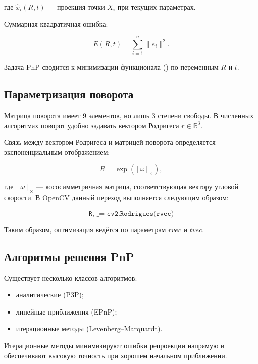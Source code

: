 \documentclass[a4paper,12pt]{article}
\begin{document}
где $\hat{x}_i(R,t)$ --- проекция точки $X_i$ при текущих параметрах.

Суммарная квадратичная ошибка:

\begin{equation}
E(R,t) = \sum_{i=1}^{n} \| e_i \|^2.
\end{equation}

Задача PnP сводится к минимизации функционала (\theequation) по переменным $R$ и $t$.

\subsection*{Параметризация поворота}

Матрица поворота имеет 9 элементов, но лишь 3 степени свободы. В численных алгоритмах поворот удобно задавать вектором Родригеса $r \in \mathbb{R}^3$.

Связь между вектором Родригеса и матрицей поворота определяется экспоненциальным отображением:

\begin{equation}
R = \exp([\omega]_\times),
\end{equation}

где $[\omega]_\times$ --- кососимметричная матрица, соответствующая вектору угловой скорости. В OpenCV данный переход выполняется следующим образом:

\begin{equation*}
\texttt{R, \_ = cv2.Rodrigues(rvec)}
\end{equation*}

Таким образом, оптимизация ведётся по параметрам $rvec$ и $tvec$.

\subsection*{Алгоритмы решения PnP}

Существует несколько классов алгоритмов:

\begin{itemize}
    \item аналитические (P3P);
    \item линейные приближения (EPnP);
    \item итерационные методы (Levenberg--Marquardt).
\end{itemize}

Итерационные методы минимизируют ошибки репроекции напрямую и обеспечивают высокую точность при хорошем начальном приближении.
\end{document}
